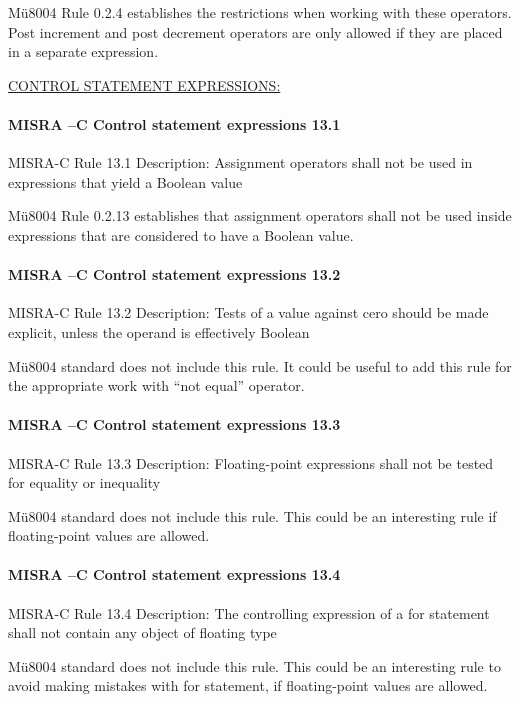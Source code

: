 Mü8004 Rule 0.2.4 establishes the restrictions when working with these operators. Post increment and post decrement operators are only allowed if they are placed in a separate expression.


\begin{center}
\textsc{\underline{CONTROL STATEMENT EXPRESSIONS:}}
\end{center}

\paragraph{MISRA –C Control statement expressions 13.1}
MISRA-C Rule 13.1 Description: Assignment operators shall not be used in expressions that yield a Boolean value

Mü8004 Rule 0.2.13 establishes that assignment operators shall not be used inside expressions that are considered to have a Boolean value.

\paragraph{MISRA –C Control statement expressions 13.2}
MISRA-C Rule 13.2 Description: Tests of a value against cero should be made explicit, unless the operand is effectively Boolean

Mü8004 standard does not include this rule. It could be useful to add this rule for the appropriate work with “not equal” operator.

\paragraph{MISRA –C Control statement expressions 13.3}
MISRA-C Rule 13.3 Description: Floating-point expressions shall not be tested for equality or inequality

Mü8004 standard does not include this rule. This could be an interesting rule if floating-point values are allowed.

\paragraph{MISRA –C Control statement expressions 13.4}
MISRA-C Rule 13.4 Description: The controlling expression of a for statement shall not contain any object of floating type

Mü8004 standard does not include this rule. This could be an interesting rule to avoid making mistakes with for statement, if floating-point values are allowed.

